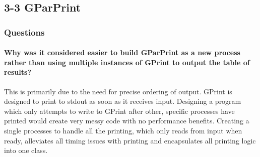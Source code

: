 \subsection{3-3 GParPrint}

\subsubsection*{Questions}

\paragraph{Why was it considered easier to build GParPrint as a new process rather than using multiple instances of GPrint to output the table of results?}

This is primarily due to the need for precise ordering of output.  GPrint is designed to print to stdout as soon as it receives input.  Designing a program which only attempts to write to GPrint after other, specific processes have printed would create very messy code with no performance benefits.  Creating a single processes to handle all the printing, which only reads from input when ready, alleviates all timing issues with printing and encapsulates all printing logic into one class.
